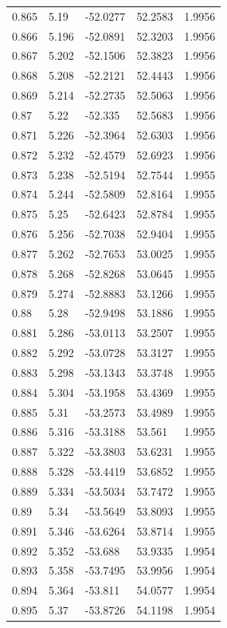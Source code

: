 \begin{tabular}{lllll}
0.865 & 5.19 & -52.0277 & 52.2583 & 1.9956 \\
0.866 & 5.196 & -52.0891 & 52.3203 & 1.9956 \\
0.867 & 5.202 & -52.1506 & 52.3823 & 1.9956 \\
0.868 & 5.208 & -52.2121 & 52.4443 & 1.9956 \\
0.869 & 5.214 & -52.2735 & 52.5063 & 1.9956 \\
0.87 & 5.22 & -52.335 & 52.5683 & 1.9956 \\
0.871 & 5.226 & -52.3964 & 52.6303 & 1.9956 \\
0.872 & 5.232 & -52.4579 & 52.6923 & 1.9956 \\
0.873 & 5.238 & -52.5194 & 52.7544 & 1.9955 \\
0.874 & 5.244 & -52.5809 & 52.8164 & 1.9955 \\
0.875 & 5.25 & -52.6423 & 52.8784 & 1.9955 \\
0.876 & 5.256 & -52.7038 & 52.9404 & 1.9955 \\
0.877 & 5.262 & -52.7653 & 53.0025 & 1.9955 \\
0.878 & 5.268 & -52.8268 & 53.0645 & 1.9955 \\
0.879 & 5.274 & -52.8883 & 53.1266 & 1.9955 \\
0.88 & 5.28 & -52.9498 & 53.1886 & 1.9955 \\
0.881 & 5.286 & -53.0113 & 53.2507 & 1.9955 \\
0.882 & 5.292 & -53.0728 & 53.3127 & 1.9955 \\
0.883 & 5.298 & -53.1343 & 53.3748 & 1.9955 \\
0.884 & 5.304 & -53.1958 & 53.4369 & 1.9955 \\
0.885 & 5.31 & -53.2573 & 53.4989 & 1.9955 \\
0.886 & 5.316 & -53.3188 & 53.561 & 1.9955 \\
0.887 & 5.322 & -53.3803 & 53.6231 & 1.9955 \\
0.888 & 5.328 & -53.4419 & 53.6852 & 1.9955 \\
0.889 & 5.334 & -53.5034 & 53.7472 & 1.9955 \\
0.89 & 5.34 & -53.5649 & 53.8093 & 1.9955 \\
0.891 & 5.346 & -53.6264 & 53.8714 & 1.9955 \\
0.892 & 5.352 & -53.688 & 53.9335 & 1.9954 \\
0.893 & 5.358 & -53.7495 & 53.9956 & 1.9954 \\
0.894 & 5.364 & -53.811 & 54.0577 & 1.9954 \\
0.895 & 5.37 & -53.8726 & 54.1198 & 1.9954 \\

\end{tabular}
